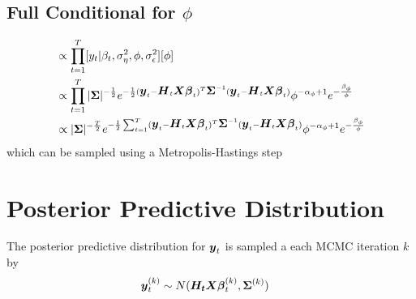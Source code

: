 \documentclass[fleqn]{article}
\def\bm#1{\mbox{\boldmath $#1$}}
\begin{document}
\subsection{Full Conditional for $\phi$}
%
\begin{align*}
  [\phi | \cdot] & \propto \prod_{t = 1}^T [y_t | \beta_t, \sigma^2_\eta, \phi, \sigma^2_\epsilon] [\phi]\\
%
& \propto \prod_{t = 1}^T | \bm{\Sigma} |^{ - \frac{1} {2}} e^{ - \frac{1} {2} (\bm{y}_t - \bm{H}_t \bm{X} \bm{\beta}_t)^T \bm{\Sigma}^{ - 1} (\bm{y}_t - \bm{H}_t \bm{X} \bm{\beta}_t)} \phi^{ - \alpha_\phi + 1} e^{ - \frac{\beta_\phi} {\phi}}\\
%
& \propto | \bm{\Sigma} |^{ - \frac{T} {2}} e^{ - \frac{1} {2} \sum_{t = 1}^T (\bm{y}_t - \bm{H}_t \bm{X} \bm{\beta}_t)^T \bm{\Sigma}^{ - 1} (\bm{y}_t - \bm{H}_t \bm{X} \bm{\beta}_t)} \phi^{ - \alpha_\phi + 1} e^{ - \frac{\beta_\phi} {\phi}}\\
\end{align*}
% 
which can be sampled using a Metropolis-Hastings step
%
\section{Posterior Predictive Distribution}
%
The posterior predictive distribution for $\bm{y}_t$ is sampled a each MCMC iteration $k$ by
\begin{align*}
  \bm{y}^{(k)}_t & \sim N(\bm{H_t} \bm{X} \bm{\beta}^{(k)}_t, \bm{\Sigma}^{(k)})
\end{align*}
\end{document}
